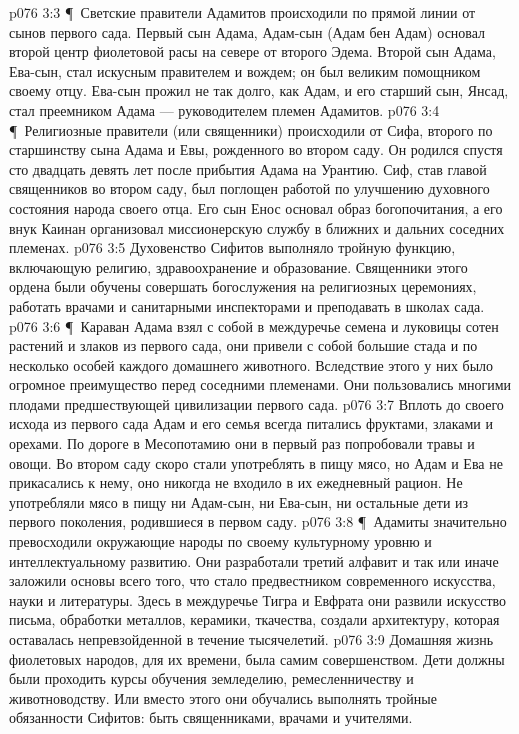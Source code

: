 \vs p076 3:3 \P\ Светские правители Адамитов происходили по прямой линии от сынов первого сада. Первый сын Адама, Адам\hyp{}сын (Адам бен Адам) основал второй центр фиолетовой расы на севере от второго Эдема. Второй сын Адама, Ева\hyp{}сын, стал искусным правителем и вождем; он был великим помощником своему отцу. Ева\hyp{}сын прожил не так долго, как Адам, и его старший сын, Янсад, стал преемником Адама --- руководителем племен Адамитов.
\vs p076 3:4 \P\ Религиозные правители (или священники) происходили от Сифа, второго по старшинству сына Адама и Евы, рожденного во втором саду. Он родился спустя сто двадцать девять лет после прибытия Адама на Урантию. Сиф, став главой священников во втором саду, был поглощен работой по улучшению духовного состояния народа своего отца. Его сын Енос основал образ богопочитания, а его внук Каинан организовал миссионерскую службу в ближних и дальних соседних племенах.
\vs p076 3:5 Духовенство Сифитов выполняло тройную функцию, включающую религию, здравоохранение и образование. Священники этого ордена были обучены совершать богослужения на религиозных церемониях, работать врачами и санитарными инспекторами и преподавать в школах сада.
\vs p076 3:6 \P\ Караван Адама взял с собой в междуречье семена и луковицы сотен растений и злаков из первого сада, они привели с собой большие стада и по несколько особей каждого домашнего животного. Вследствие этого у них было огромное преимущество перед соседними племенами. Они пользовались многими плодами предшествующей цивилизации первого сада.
\vs p076 3:7 Вплоть до своего исхода из первого сада Адам и его семья всегда питались фруктами, злаками и орехами. По дороге в Месопотамию они в первый раз попробовали травы и овощи. Во втором саду скоро стали употреблять в пищу мясо, но Адам и Ева не прикасались к нему, оно никогда не входило в их ежедневный рацион. Не употребляли мясо в пищу ни Адам\hyp{}сын, ни Ева\hyp{}сын, ни остальные дети из первого поколения, родившиеся в первом саду.
\vs p076 3:8 \P\ Адамиты значительно превосходили окружающие народы по своему культурному уровню и интеллектуальному развитию. Они разработали третий алфавит и так или иначе заложили основы всего того, что стало предвестником современного искусства, науки и литературы. Здесь в междуречье Тигра и Евфрата они развили искусство письма, обработки металлов, керамики, ткачества, создали архитектуру, которая оставалась непревзойденной в течение тысячелетий.
\vs p076 3:9 Домашняя жизнь фиолетовых народов, для их времени, была самим совершенством. Дети должны были проходить курсы обучения земледелию, ремесленничеству и животноводству. Или вместо этого они обучались выполнять тройные обязанности Сифитов: быть священниками, врачами и учителями.
